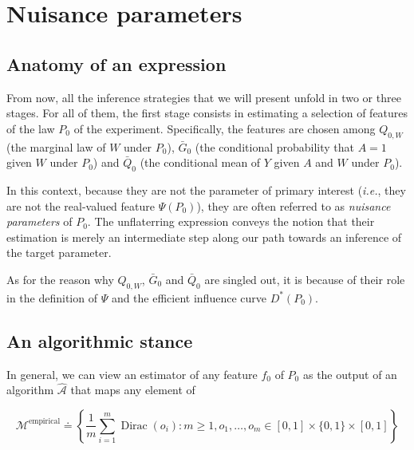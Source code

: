 \documentclass[
  11pt,
  openright,twoside]{book}
\DeclareMathOperator{\Dirac}{Dirac}
\newcommand{\Algo}{\widehat{\mathcal{A}}}
\newcommand{\defq}{\doteq}
\newcommand{\calM}{\mathcal{M}}
\newcommand{\Gbar}{\bar{G}}
\newcommand{\Qbar}{\bar{Q}}
\theoremstyle{definition}
\theoremstyle{definition}
\theoremstyle{definition}
\theoremstyle{definition}
\theoremstyle{remark}
\begin{document}
\hypertarget{nuisance}{%
\chapter{Nuisance parameters}\label{nuisance}}

\hypertarget{anatomy}{%
\section{Anatomy of an expression}\label{anatomy}}


From now, all the inference strategies that we will present unfold in two or
three stages. For all of them, the first stage consists in estimating a
selection of features of the law \(P_{0}\) of the experiment. Specifically, the
features are chosen among \(Q_{0,W}\) (the marginal law of \(W\) under \(P_{0}\)),
\(\Gbar_{0}\) (the conditional probability that \(A=1\) given \(W\) under \(P_{0}\))
and \(\Qbar_{0}\) (the conditional mean of \(Y\) given \(A\) and \(W\) under \(P_{0}\)).

In this context, because they are not the parameter of primary interest
(\emph{i.e.}, they are not the real-valued feature \(\Psi(P_{0})\)), they are often
referred to as \emph{nuisance parameters} of \(P_{0}\). The unflaterring expression
conveys the notion that their estimation is merely an intermediate step along
our path towards an inference of the target parameter.

As for the reason why \(Q_{0,W}\), \(\Gbar_{0}\) and \(\Qbar_{0}\) are singled out,
it is because of their role in the definition of \(\Psi\) and the efficient
influence curve \(D^{*}(P_{0})\).


\hypertarget{an-algorithmic-stance}{%
\section{An algorithmic stance}\label{an-algorithmic-stance}}


In general, we can view an estimator of any feature \(f_0\) of \(P_{0}\) as the
output of an algorithm \(\Algo\) that maps any element of

\begin{equation*}    \calM^{\text{empirical}}     \defq    \left\{\frac{1}{m}
\sum_{i=1}^{m} \Dirac(o_{i}) : m \geq 1, o_{1}, \ldots, o_{m} \in [0,1] \times
\{0,1\} \times [0,1]\right\} \end{equation*}
\end{document}
